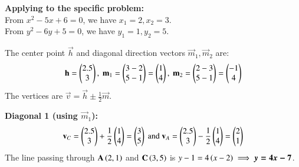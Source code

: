 \documentclass[journal]{IEEEtran}
\theoremstyle{remark}
\begin{document}
\textbf{Applying to the specific problem:} \\
From $x^2 - 5x + 6 = 0$, we have $x_1=2, x_2=3$. \\
From $y^2 - 6y + 5 = 0$, we have $y_1=1, y_2=5$.

\noindent
The center point $\vec{h}$ and diagonal direction vectors $\vec{m}_1, \vec{m}_2$ are:
\vspace{0.2cm}
\begin{align}
    \vec{h} = \myvec{ 2.5 \\ 3 }, \ 
    \vec{m}_1 = \myvec{ 3-2 \\ 5-1 } = \myvec{ 1 \\ 4 }, \ 
    \vec{m}_2 = \myvec{ 2-3 \\ 5-1 } = \myvec{ -1 \\ 4 }
\end{align}
The vertices are $\vec{v} = \vec{h} \pm \frac{1}{2}\vec{m}$.

\noindent
\textbf{Diagonal 1 (using $\vec{m}_1$):}
\vspace{0.2cm}
\begin{align*}
    \vec{v}_C = \myvec{ 2.5 \\ 3 } + \frac{1}{2}\myvec{ 1 \\ 4 } = \myvec{ 3 \\ 5 } \  \text{and} \ 
    \vec{v}_A = \myvec{ 2.5 \\ 3 } - \frac{1}{2}\myvec{ 1 \\ 4 } = \myvec{ 2 \\ 1 }
\end{align*}
The line passing through $\mathbf{A}\left(2,1\right)$ and $\mathbf{C}\left(3,5\right)$ is $y-1 = 4\left(x-2\right) \implies \boldsymbol{y = 4x - 7}$.
\end{document}
